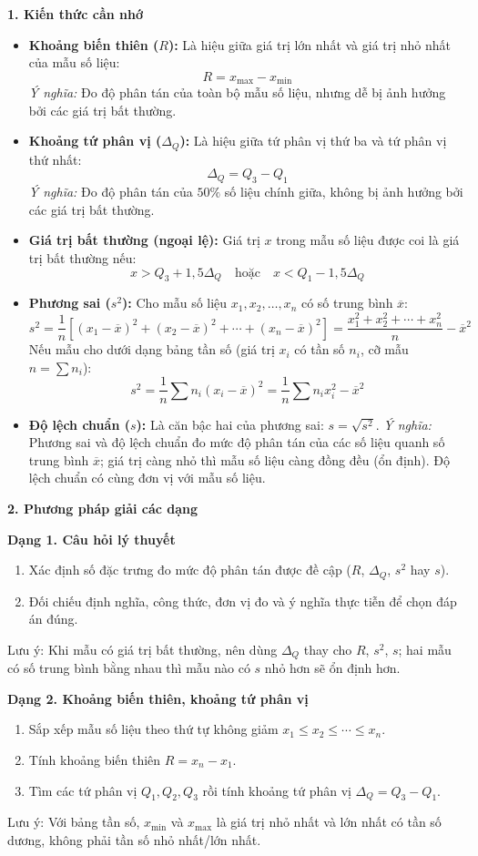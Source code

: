 \textbf{1. Kiến thức cần nhớ}
\begin{itemize}
\item \textbf{Khoảng biến thiên ($R$):} Là hiệu giữa giá trị lớn nhất và giá trị nhỏ nhất của mẫu số liệu:
\[ \boxed{R = x_{\max} - x_{\min}} \]
\textit{Ý nghĩa:} Đo độ phân tán của toàn bộ mẫu số liệu, nhưng dễ bị ảnh hưởng bởi các giá trị bất thường.
\item \textbf{Khoảng tứ phân vị ($\Delta_Q$):} Là hiệu giữa tứ phân vị thứ ba và tứ phân vị thứ nhất:
\[ \boxed{\Delta_Q = Q_3 - Q_1} \]
\textit{Ý nghĩa:} Đo độ phân tán của $50\%$ số liệu chính giữa, không bị ảnh hưởng bởi các giá trị bất thường.
\item \textbf{Giá trị bất thường (ngoại lệ):} Giá trị $x$ trong mẫu số liệu được coi là giá trị bất thường nếu:
\[ \boxed{x > Q_3 + 1{,}5\Delta_Q \quad \text{hoặc} \quad x < Q_1 - 1{,}5\Delta_Q} \]
\item \textbf{Phương sai ($s^2$):} Cho mẫu số liệu $x_1, x_2, \ldots, x_n$ có số trung bình $\overline{x}$:
\[ \boxed{s^2 = \dfrac{1}{n}\left[(x_1 - \overline{x})^2 + (x_2 - \overline{x})^2 + \cdots + (x_n - \overline{x})^2\right] = \dfrac{x_1^2 + x_2^2 + \cdots + x_n^2}{n} - \overline{x}^2} \]
Nếu mẫu cho dưới dạng bảng tần số (giá trị $x_i$ có tần số $n_i$, cỡ mẫu $n = \sum n_i$):
\[ s^2 = \dfrac{1}{n}\sum n_i (x_i - \overline{x})^2 = \dfrac{1}{n}\sum n_i x_i^2 - \overline{x}^2 \]
\item \textbf{Độ lệch chuẩn ($s$):} Là căn bậc hai của phương sai: $\boxed{s = \sqrt{s^2}}$.
\textit{Ý nghĩa:} Phương sai và độ lệch chuẩn đo mức độ phân tán của các số liệu quanh số trung bình $\overline{x}$; giá trị càng nhỏ thì mẫu số liệu càng đồng đều (ổn định). Độ lệch chuẩn có cùng đơn vị với mẫu số liệu.
\end{itemize}

\textbf{2. Phương pháp giải các dạng}

\textbf{Dạng 1. Câu hỏi lý thuyết}
\begin{enumerate}
\item Xác định số đặc trưng đo mức độ phân tán được đề cập ($R$, $\Delta_Q$, $s^2$ hay $s$).
\item Đối chiếu định nghĩa, công thức, đơn vị đo và ý nghĩa thực tiễn để chọn đáp án đúng.
\end{enumerate}
Lưu ý: Khi mẫu có giá trị bất thường, nên dùng $\Delta_Q$ thay cho $R$, $s^2$, $s$; hai mẫu có số trung bình bằng nhau thì mẫu nào có $s$ nhỏ hơn sẽ ổn định hơn.

\textbf{Dạng 2. Khoảng biến thiên, khoảng tứ phân vị}
\begin{enumerate}
\item Sắp xếp mẫu số liệu theo thứ tự không giảm $x_1 \le x_2 \le \cdots \le x_n$.
\item Tính khoảng biến thiên $R = x_n - x_1$.
\item Tìm các tứ phân vị $Q_1, Q_2, Q_3$ rồi tính khoảng tứ phân vị $\Delta_Q = Q_3 - Q_1$.
\end{enumerate}
Lưu ý: Với bảng tần số, $x_{\min}$ và $x_{\max}$ là giá trị nhỏ nhất và lớn nhất có tần số dương, không phải tần số nhỏ nhất/lớn nhất.

